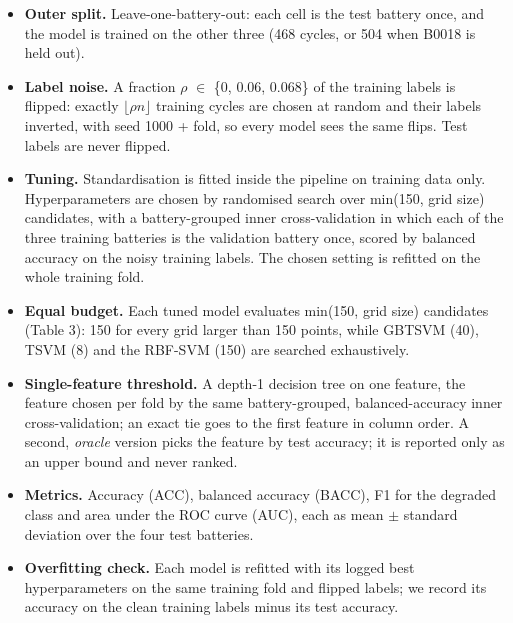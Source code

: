 \documentclass[conference,a4paper]{IEEEtran}
\begin{document}
\begin{itemize}
\item \textbf{Outer split.} Leave-one-battery-out: each cell is the test battery once, and the model is trained on the other three (468 cycles, or 504 when B0018 is held out).
\item \textbf{Label noise.} A fraction $\rho$ $\in$ \{0, 0.06, 0.068\} of the training labels is flipped: exactly $\lfloor\rho n\rfloor$ training cycles are chosen at random and their labels inverted, with seed 1000 + fold, so every model sees the same flips. Test labels are never flipped.
\item \textbf{Tuning.} Standardisation is fitted inside the pipeline on training data only. Hyperparameters are chosen by randomised search over min(150, grid size) candidates, with a battery-grouped inner cross-validation in which each of the three training batteries is the validation battery once, scored by balanced accuracy on the noisy training labels. The chosen setting is refitted on the whole training fold.
\item \textbf{Equal budget.} Each tuned model evaluates min(150, grid size) candidates (Table 3): 150 for every grid larger than 150 points, while GBTSVM (40), TSVM (8) and the RBF-SVM (150) are searched exhaustively.
\item \textbf{Single-feature threshold.} A depth-1 decision tree on one feature, the feature chosen per fold by the same battery-grouped, balanced-accuracy inner cross-validation; an exact tie goes to the first feature in column order. A second, \emph{oracle} version picks the feature by test accuracy; it is reported only as an upper bound and never ranked.
\item \textbf{Metrics.} Accuracy (ACC), balanced accuracy (BACC), F1 for the degraded class and area under the ROC curve (AUC), each as mean $\pm$ standard deviation over the four test batteries.
\item \textbf{Overfitting check.} Each model is refitted with its logged best hyperparameters on the same training fold and flipped labels; we record its accuracy on the clean training labels minus its test accuracy.
\end{itemize}
\end{document}
